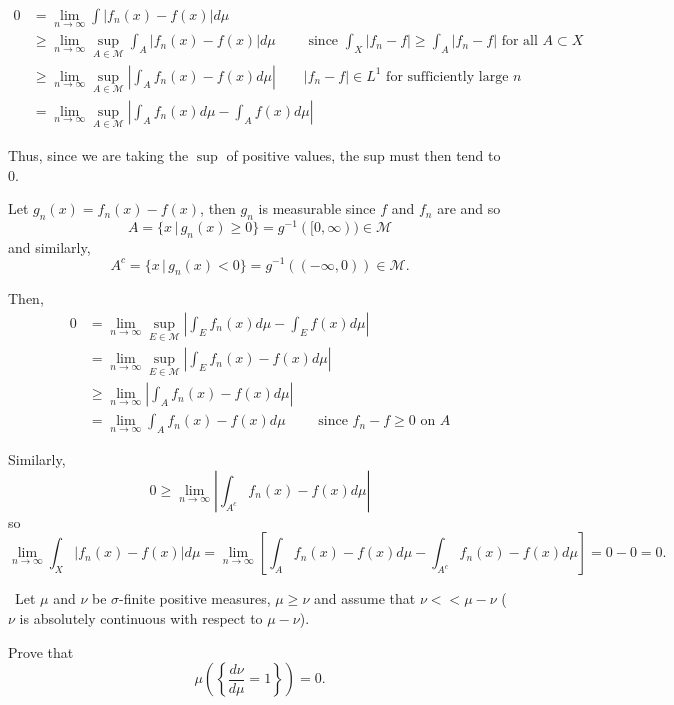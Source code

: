 \documentclass[12pt]{Qual}
\begin{document}
\begin{solution}$\,$
\boxed{\implies} \begin{align*}
    0&=\lim_{n\to\infty}\int|f_n(x)-f(x)|d\mu\\
    &\ge\lim_{n\to\infty}\sup_{A\in\mathscr{M}}\int_A|f_n(x)-f(x)|d\mu\qquad\text{ since }\int_X|f_n-f|\ge\int_A|f_n-f|\text{ for all }A\subset X\\
    &\ge\lim_{n\to\infty}\sup_{A\in\mathscr{M}}\left|\int_Af_n(x)-f(x)d\mu\right|\qquad |f_n-f|\in L^1\text{ for sufficiently large }n\\
    &=\lim_{n\to\infty}\sup_{A\in\mathscr{M}}\left|\int_A f_n(x)d\mu-\int_Af(x)d\mu\right|
\end{align*}

Thus, since we are taking the $\sup$ of positive values, the sup must then tend to $0$.

\boxed{\impliedby} Let $g_n(x)=f_n(x)-f(x)$, then $g_n$ is measurable since $f$ and $f_n$ are and so $$A=\{x\,|\,g_n(x)\ge 0\}=g^{-1}([0,\infty))\in\mathscr{M}$$ and similarly, $$A^c=\{x\,|\, g_n(x)<0\}=g^{-1}((-\infty,0))\in\mathscr{M}.$$

Then, \begin{align*}
    0&=\lim_{n\to\infty}\sup_{E\in\mathscr{M}}\left|\int_Ef_n(x)d\mu-\int_Ef(x)d\mu\right|\\
    &=\lim_{n\to\infty}\sup_{E\in\mathscr{M}}\left|\int_Ef_n(x)-f(x)d\mu\right|\\
    &\ge\lim_{n\to\infty}\left|\int_Af_n(x)-f(x)d\mu\right|\\
    &=\lim_{n\to\infty}\int_Af_n(x)-f(x)d\mu\qquad\text{ since }f_n-f\ge0\text{ on }A
\end{align*}

Similarly, $$0\ge\lim_{n\to\infty}\left|\int_{A^c}f_n(x)-f(x)d\mu\right|$$ so $$\lim_{n\to\infty}\int_X|f_n(x)-f(x)|d\mu=\lim_{n\to\infty}\left[\int_Af_n(x)-f(x)d\mu-\int_{A^c}f_n(x)-f(x)d\mu\right]=0-0=0.$$
\end{solution}
\newpage

\begin{problem} $\,$
Let $\mu$ and $\nu$ be $\sigma$-finite positive measures, $\mu\ge\nu$ and assume that $\nu<<\mu-\nu$ ($\nu$ is absolutely continuous with respect to $\mu-\nu$).

Prove that $$\mu\left(\left\{\frac{d\nu}{d\mu}=1\right\}\right)=0.$$
\end{problem}
\end{document}
